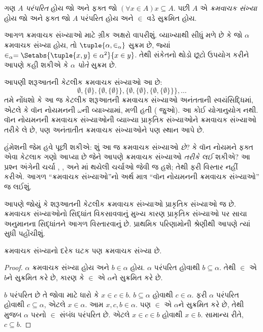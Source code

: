\begin{defn}
ગણ $A$ \emph{પરંપરિત} હોય જો અને ફક્ત જો
$(\forall x \in A)x \subseteq
A$. પછી $A$ એ \emph{ક્રમવાચક સંખ્યા} હોય જો અને ફક્ત
જો $A$ પરંપરિત હોય અને $\in$ વડે સુક્રમિત હોય.
\end{defn}
\noindent
આગળ ક્રમવાચક સંખ્યાઓ માટે ગ્રીક અક્ષરો વાપરીશું.
વ્યાખ્યાથી સીધું મળે છે કે જો $\alpha$ ક્રમવાચક
સંખ્યા હોય, તો $\tuple{\alpha, \in_\alpha}$
સુક્રમ છે, જ્યાં $\in_\alpha =
\Setabs{\tuple{x, y} \in \alpha^2}{x \in y}$.
તેથી સંકેતનો થોડો છૂટો ઉપયોગ કરીને આપણે કહી
શકીએ કે $\alpha$ \emph{પોતે} સુક્રમ છે.

આપણી શરૂઆતની કેટલીક ક્રમવાચક સંખ્યાઓ આ છે:
\[
	\emptyset, \{\emptyset\},
	\{\emptyset, \{\emptyset\}\},
	\{\emptyset, \{\emptyset\}, \{\emptyset, \{\emptyset\}\}\}, \ldots
\]
તમે નોંધશો કે આ જ કેટલીક શરૂઆતની ક્રમવાચક
સંખ્યાઓ અનંતતાની સ્વયંસિદ્ધિમાં, એટલે કે વૉન
નોયમનની $\omega$ની વ્યાખ્યામાં, મળી હતી
( જુઓ).
આ કોઈ યોગાનુયોગ નથી. વૉન નોયમનની ક્રમવાચક
સંખ્યાઓની વ્યાખ્યા પ્રાકૃતિક સંખ્યાઓને ક્રમવાચક
સંખ્યાઓ તરીકે લે છે, પણ અનંતાતીત ક્રમવાચક
સંખ્યાઓને પણ સ્થાન આપે છે.

હંમેશની જેમ હવે પૂછી શકીએ: શું આ જ ક્રમવાચક
સંખ્યાઓ \emph{છે}? કે વૉન નોયમને ફક્ત એવા
કેટલાક ગણો આપ્યા છે જેને આપણે ક્રમવાચક
સંખ્યાઓ \emph{તરીકે લઈ} શકીએ?
આ પ્રશ્ન અંગેની ચર્ચા
,
,
 અને
માં થયેલી ચર્ચાઓ જેવી
જ હશે; તેથી ફરી વિસ્તાર નહીં કરીએ.
આગળ “ક્રમવાચક સંખ્યાઓ”નો અર્થ માત્ર “વૉન
નોયમનની ક્રમવાચક સંખ્યાઓ” જ લઈશું.
\endgroup

\begingroup
\makeatletter{}\makeatother

\label{guunit:OLP-0553}


આપણે જોયું કે શરૂઆતની કેટલીક ક્રમવાચક સંખ્યાઓ
પ્રાકૃતિક સંખ્યાઓ જ છે. ક્રમવાચક સંખ્યાઓનો સિદ્ધાંત
વિકસાવવાનું મુખ્ય કારણ પ્રાકૃતિક સંખ્યાઓ પર સાચા
અનુમાનના સિદ્ધાંતને આગળ વિસ્તારવાનું છે. પ્રાથમિક
પરિણામોની શ્રેણીથી આપણે ત્યાં સુધી પહોંચીશું.

\begin{lem}
ક્રમવાચક સંખ્યાનો દરેક ઘટક પણ ક્રમવાચક
સંખ્યા છે.
\end{lem}

\begin{proof}
$\alpha$ ક્રમવાચક સંખ્યા હોય અને $b \in \alpha$ હોય.
$\alpha$ પરંપરિત હોવાથી $b \subseteq \alpha$.
તેથી $\in$ એ $b$ને સુક્રમિત કરે છે, કારણ કે
$\in$ એ $\alpha$ને સુક્રમિત કરે છે.

$b$ પરંપરિત છે તે જોવા માટે ધારો કે $x \in c \in b$.
$b
\subseteq \alpha$ હોવાથી $c \in \alpha$.
ફરી $\alpha$ પરંપરિત હોવાથી $c \subseteq
\alpha$, એટલે $x \in \alpha$.
આમ $x, c, b \in \alpha$.
પણ $\in$ એ $\alpha$ને સુક્રમિત કરે છે, તેથી
 મુજબ
$\alpha$ પરનો $\in$ સંબંધ પરંપરિત છે.
એટલે $x
\in c \in b$ હોવાથી $x \in b$.
સામાન્ય રીતે, $c \subseteq b$.
\end{proof}

